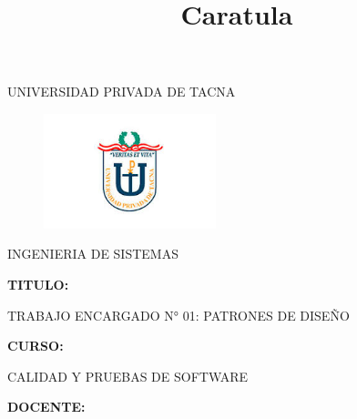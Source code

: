 \documentclass[12pt,letterpaper]{article}
\begin{document}
%


\title{Caratula}

\begin{titlepage}
\begin{center}
\large{UNIVERSIDAD PRIVADA DE TACNA}\\
\vspace*{-0.025in}
\begin{figure}[htb]
\begin{center}
	\includegraphics[width=5cm]{./imagenes/logo.jpg} 
\end{center}
\end{figure}
\vspace*{0.15in}
INGENIERIA DE SISTEMAS  \\

\vspace*{0.5in}
\begin{large}
\textbf{TITULO:}\\
\end{large}

\vspace*{0.1in}
\begin{Large}
TRABAJO ENCARGADO N° 01: PATRONES DE DISEÑO \\
\end{Large}

\vspace*{0.3in}
\begin{Large}
\textbf{CURSO:} \\
\end{Large}

\vspace*{0.1in}
\begin{large}
CALIDAD Y PRUEBAS DE SOFTWARE\\
\end{large}

\vspace*{0.3in}
\begin{Large}
\textbf{DOCENTE:} \\
\end{Large}


\end{center}
\end{titlepage}
\end{document}
